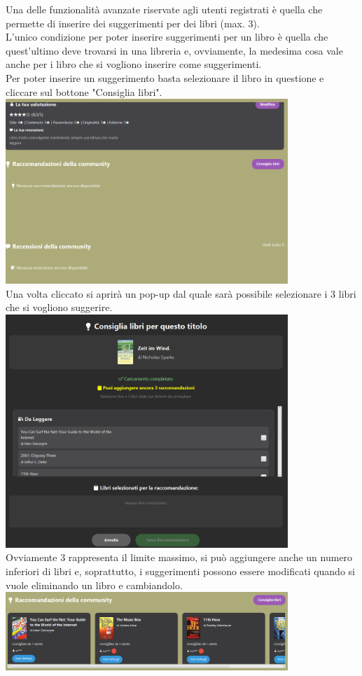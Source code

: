 \documentclass[12pt,a4paper]{article}
\begin{document}
Una delle funzionalità avanzate riservate agli utenti registrati è quella che permette di inserire dei suggerimenti per dei libri (max. 3).
\\L'unico condizione per poter inserire suggerimenti per un libro è quella che quest'ultimo deve trovarsi in una libreria e,
ovviamente, la medesima cosa vale anche per i libro che si vogliono inserire come suggerimenti.
\\Per poter inserire un suggerimento basta selezionare il libro in questione e cliccare sul bottone "Consiglia libri".
\\\includegraphics[width=0.8\textwidth]{img/suggerimenti}
\\Una volta cliccato si aprirà un pop-up dal quale sarà possibile selezionare i 3 libri che si vogliono suggerire.
\\\includegraphics[width=0.8\textwidth]{img/interfacciaSugg}
\\Ovviamente 3 rappresenta il limite massimo, si può aggiungere anche un numero inferiori di libri e, soprattutto, i suggerimenti possono essere modificati quando si vuole eliminando un libro e cambiandolo.
\\\includegraphics[width=0.8\textwidth]{img/listaSugg}
\end{document}
